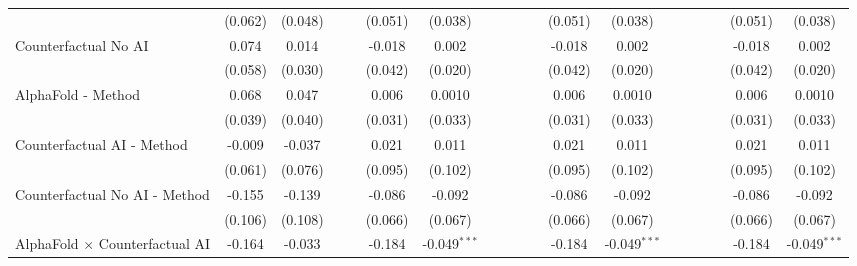 \begin{tabular}{lcccccccccccccccccc}
                                                              & (0.062) & (0.048)  &     &     & (0.051)       & (0.038)        &     &     &     &      & (0.051)       & (0.038)        &      &      &      &      & (0.051)       & (0.038)\\   
   Counterfactual No AI                                       & 0.074   & 0.014    &     &     & -0.018        & 0.002          &     &     &     &      & -0.018        & 0.002          &      &      &      &      & -0.018        & 0.002\\   
                                                              & (0.058) & (0.030)  &     &     & (0.042)       & (0.020)        &     &     &     &      & (0.042)       & (0.020)        &      &      &      &      & (0.042)       & (0.020)\\   
   AlphaFold - Method                                         & 0.068   & 0.047    &     &     & 0.006         & 0.0010         &     &     &     &      & 0.006         & 0.0010         &      &      &      &      & 0.006         & 0.0010\\   
                                                              & (0.039) & (0.040)  &     &     & (0.031)       & (0.033)        &     &     &     &      & (0.031)       & (0.033)        &      &      &      &      & (0.031)       & (0.033)\\   
   Counterfactual AI - Method                                 & -0.009  & -0.037   &     &     & 0.021         & 0.011          &     &     &     &      & 0.021         & 0.011          &      &      &      &      & 0.021         & 0.011\\   
                                                              & (0.061) & (0.076)  &     &     & (0.095)       & (0.102)        &     &     &     &      & (0.095)       & (0.102)        &      &      &      &      & (0.095)       & (0.102)\\   
   Counterfactual No AI - Method                              & -0.155  & -0.139   &     &     & -0.086        & -0.092         &     &     &     &      & -0.086        & -0.092         &      &      &      &      & -0.086        & -0.092\\   
                                                              & (0.106) & (0.108)  &     &     & (0.066)       & (0.067)        &     &     &     &      & (0.066)       & (0.067)        &      &      &      &      & (0.066)       & (0.067)\\   
   AlphaFold $\times$ Counterfactual AI                       & -0.164  & -0.033   &     &     & -0.184        & -0.049$^{***}$ &     &     &     &      & -0.184        & -0.049$^{***}$ &      &      &      &      & -0.184        & -0.049$^{***}$\\   

\end{tabular}
